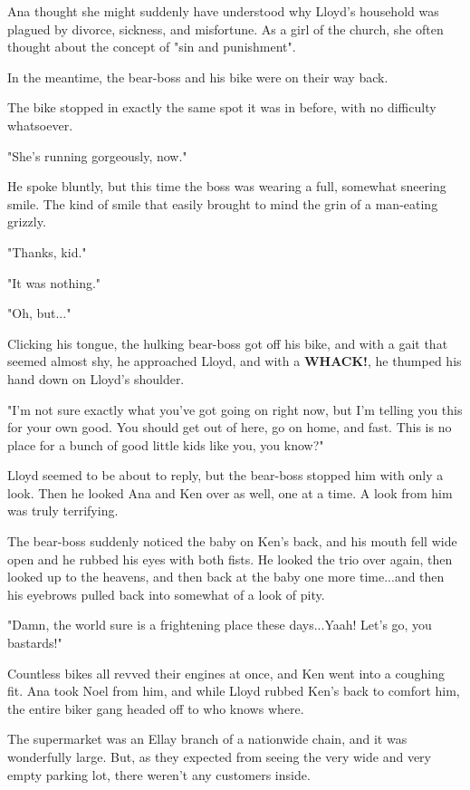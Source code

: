 \documentclass[
]{article}
\begin{document}
Ana thought she might suddenly have understood why Lloyd's household was
plagued by divorce, sickness, and misfortune. As a girl of the church,
she often thought about the concept of "sin and punishment".

In the meantime, the bear-boss and his bike were on their way back.

The bike stopped in exactly the same spot it was in before, with no
difficulty whatsoever.

"She's running gorgeously, now."

He spoke bluntly, but this time the boss was wearing a full, somewhat
sneering smile. The kind of smile that easily brought to mind the grin
of a man-eating grizzly.

"Thanks, kid."

"It was nothing."

"Oh, but..."

Clicking his tongue, the hulking bear-boss got off his bike, and with a
gait that seemed almost shy, he approached Lloyd, and with a
\textbf{WHACK!}, he thumped his hand down on Lloyd's shoulder.

"I'm not sure exactly what you've got going on right now, but I'm
telling you this for your own good. You should get out of here, go on
home, and fast. This is no place for a bunch of good little kids like
you, you know?"

Lloyd seemed to be about to reply, but the bear-boss stopped him with
only a look. Then he looked Ana and Ken over as well, one at a time. A
look from him was truly terrifying.

The bear-boss suddenly noticed the baby on Ken's back, and his mouth
fell wide open and he rubbed his eyes with both fists. He looked the
trio over again, then looked up to the heavens, and then back at the
baby one more time...and then his eyebrows pulled back into somewhat of
a look of pity.

"Damn, the world sure is a frightening place these days...Yaah! Let's
go, you bastards!"

Countless bikes all revved their engines at once, and Ken went into a
coughing fit. Ana took Noel from him, and while Lloyd rubbed Ken's back
to comfort him, the entire biker gang headed off to who knows where.

The supermarket was an Ellay branch of a nationwide chain, and it was
wonderfully large. But, as they expected from seeing the very wide and
very empty parking lot, there weren't any customers inside.
\end{document}
